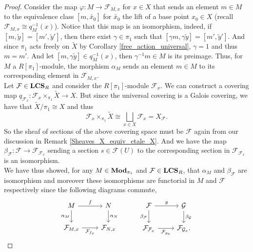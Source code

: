 \documentclass{article}
\theoremstyle{plain}
\theoremstyle{definition}
\DeclareMathOperator{\LCS}{\bf{LCS}}
\DeclareMathOperator{\Mod}{\bf{Mod}}
\begin{document}
\begin{proof}
    Consider the map $\varphi:M\rightarrow \mathcal{F}_{M,x}$ for $x\in X$ that sends an element $m\in M$ to the equivalence class $[m, \widetilde{x_0}]$ for $\widetilde{x_0}$ the lift of a base point $x_0\in X$ (recall $\mathcal{F}_{M,x}\cong q_M^{-1}(x)$). 
    Notice that this map is an isomorphism, indeed,
    if $[m,\tilde{y}] = [m',\tilde{y}']$, then there exist $\gamma\in\pi_1$ such that $[\gamma m,\gamma\tilde{y}] = [m',\tilde{y}']$. 
    And since $\pi_1$ acts freely on $\widetilde{X}$ by Corollary \ref{free_action_universal}, $\gamma = 1$ and thus $m=m'$. 
    And let $[m,\gamma\tilde{y}]\in q_M^{-1}(x)$, then $\gamma^{-1}m\in M$ is its preimage.
    Thus, for $M$ a $R[\pi_1]$-module, the morphism $\alpha_M$ sends an element $m\in M$ to its corresponding element in $\mathcal{F}_{M,x}$.\\    
    Let $\mathcal{F}\in \LCS_R$ and consider the $R[\pi_1]$-module $\mathcal{F}_x$. We can construct a covering map $q_{\mathcal{F}_x} : \mathcal{F}_x\times_{\pi_1}\widetilde{X}\rightarrow X$. But since the universal covering is a Galois covering, we have that $\widetilde{X}/\pi_1\cong X$ and thus $$\mathcal{F}_x\times_{\pi_1}\widetilde{X} \cong \bigsqcup_{x\in X} \mathcal{F}_x = X_{\mathcal{F}}.$$
    So the sheaf of sections of the above covering space must be $\mathcal{F}$ again from our discussion in Remark \ref{Sheaves_X_equiv_etale_X}.
    And we have the map $\beta_{\mathcal{F}}:\mathcal{F}\rightarrow \mathcal{F}_{\mathcal{F}_x}$ sending a section $s\in \mathcal{F}(U)$ to the corresponding section in $\mathcal{F}_{\mathcal{F}_x}$ is an isomorphism.\\
    We have thus showed, for any $M\in\Mod_{\pi_1}$ and $\mathcal{F}\in \LCS_R$, that $\alpha_M$ and $\beta_{\mathcal{F}}$ are isomorphism and moreover these isomorphisms are functorial in $M$ and $\mathcal{F}$ respectively since the following diagrams commute,
    \[
    \begin{tikzcd}
        M \arrow[r,"f"] \arrow[d, "\alpha_M"']
        & N \arrow[d,"\alpha_{N}"] \\
        \mathcal{F}_{M,x} \arrow[r,"\mathcal{F}_{f_x}"']
        &  \mathcal{F}_{N,x}
    \end{tikzcd}
    \hspace{1cm}
    \begin{tikzcd}
        \mathcal{F} \arrow[r,"g"] \arrow[d, "\beta_{\mathcal{F}}"']
        & \mathcal{G} \arrow[d,"\beta_{\mathcal{G}}"] \\
        \mathcal{F}_{\mathcal{F}_x} \arrow[r,"\mathcal{F}_{g_{x}}"']
        &  \mathcal{F}_{\mathcal{G}_x}.
    \end{tikzcd}
    \]

\end{proof}
\end{document}

